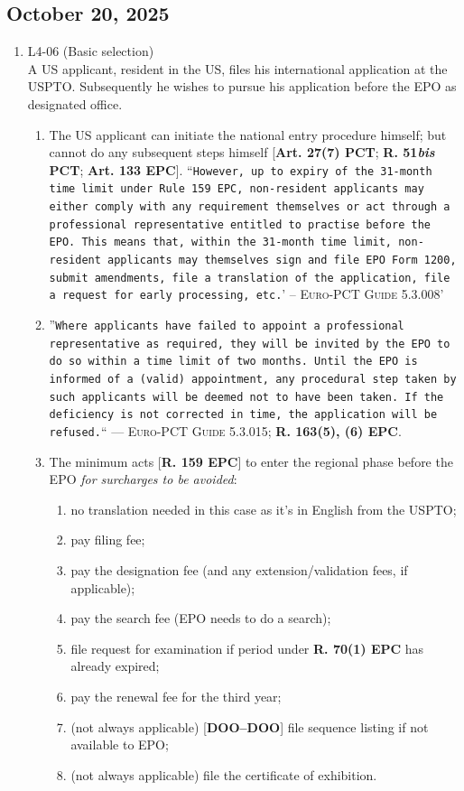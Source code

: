 \documentclass{report}
\begin{document}
\begin{enumerate}[label=\textbf{Answer \arabic*}]
    \section{October 20, 2025}

\begin{enumerate}[label=\textbf{Answer \arabic*}]

    \item %
    L4-06 (Basic selection) \\
    A US applicant, resident in the US, files his international application at the USPTO. Subsequently he wishes to pursue his application before the EPO as designated office.
    \begin{enumerate}[label=(\alph*)]
        \item The US applicant can initiate the national entry procedure himself; but cannot do any subsequent steps himself [\textbf{Art. 27(7) PCT}; \textbf{R. 51\textit{bis} PCT}; \textbf{Art. 133 EPC}]. ``\texttt{However, up to expiry of the 31-month time limit under Rule 159
EPC, non-resident applicants may either comply with any
requirement themselves or act through a professional
representative entitled to practise before the EPO. This means
that, within the 31-month time limit, non-resident applicants may
themselves sign and file EPO Form 1200, submit amendments, file
a translation of the application, file a request for early processing,
etc.}' -- \textsc{Euro-PCT Guide 5.3.008}'
        \item ''\texttt{Where applicants have failed to appoint a professional
representative as required, they will be invited by the EPO to do so
within a time limit of two months. Until the EPO is informed of a
(valid) appointment, any procedural step taken by such applicants
will be deemed not to have been taken. If the deficiency is not
corrected in time, the application will be refused.}`` --- \textsc{Euro-PCT Guide 5.3.015}; \textbf{R. 163(5), (6) EPC}.
        \item  The minimum acts [\textbf{R. 159 EPC}] to enter the regional phase before the EPO \textit{for surcharges to be avoided}: 
        \begin{enumerate}[label=(\roman*)]
         \item no translation needed in this case as it's in English from the USPTO;
\item pay filing fee;
\item pay the designation fee (and any extension/validation fees, if applicable);
\item pay the search fee (EPO needs to do a search);
\item file request for examination if period under \textbf{R. 70(1) EPC} has already expired;
\item pay the renewal fee for the third year;
\item (not always applicable) [\textbf{DOO--DOO}] file sequence listing if not available to EPO;
\item (not always applicable) file the certificate of exhibition. 



\end{enumerate}
\end{enumerate}
\end{enumerate}
\end{enumerate}
\end{document}
